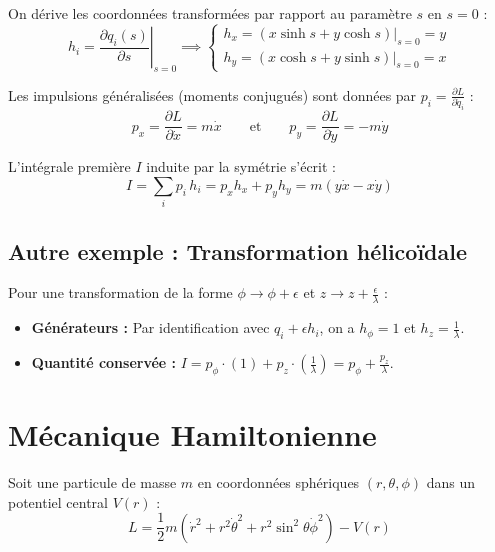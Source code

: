 \documentclass[french]{yLectureNote}
\begin{document}
On dérive les coordonnées transformées par rapport au paramètre $s$ en $s=0$ :
$$ h_i = \left. \frac{\partial q_i(s)}{\partial s} \right|_{s=0} \implies 
\begin{cases} 
h_x = \left. (x\sinh s + y\cosh s) \right|_{s=0} = y \\ 
h_y = \left. (x\cosh s + y\sinh s) \right|_{s=0} = x 
\end{cases} $$

Les impulsions généralisées (moments conjugués) sont données par $p_i = \frac{\partial L}{\partial \dot{q}_i}$ :
$$ p_x = \frac{\partial L}{\partial \dot{x}} = m\dot{x} \qquad \text{et} \qquad p_y = \frac{\partial L}{\partial \dot{y}} = -m\dot{y} $$

\begin{theorem}
L'intégrale première $I$ induite par la symétrie s'écrit :
$$ I = \sum_i p_i \, h_i = p_x h_x + p_y h_y = m(y\dot{x} - x\dot{y}) $$
\end{theorem}

\subsection{Autre exemple : Transformation hélicoïdale}
Pour une transformation de la forme $\phi \to \phi + \epsilon$ et $z \to z + \frac{\epsilon}{\lambda}$ :
\begin{itemize}
    \item \textbf{Générateurs :} Par identification avec $q_i + \epsilon h_i$, on a $h_\phi = 1$ et $h_z = \frac{1}{\lambda}$.
    \item \textbf{Quantité conservée :} $I = p_\phi \cdot (1) + p_z \cdot \left(\frac{1}{\lambda}\right) = p_\phi + \frac{p_z}{\lambda}$.
\end{itemize}

\section{Mécanique Hamiltonienne}

Soit une particule de masse $m$ en coordonnées sphériques $(r, \theta, \phi)$ dans un potentiel central $V(r)$ :
$$ L = \frac{1}{2}m\left(\dot{r}^{2}+r^{2}\dot{\theta}^{2}+r^{2}\sin^{2}\theta\dot{\phi}^{2}\right)-V(r) $$
\end{document}
